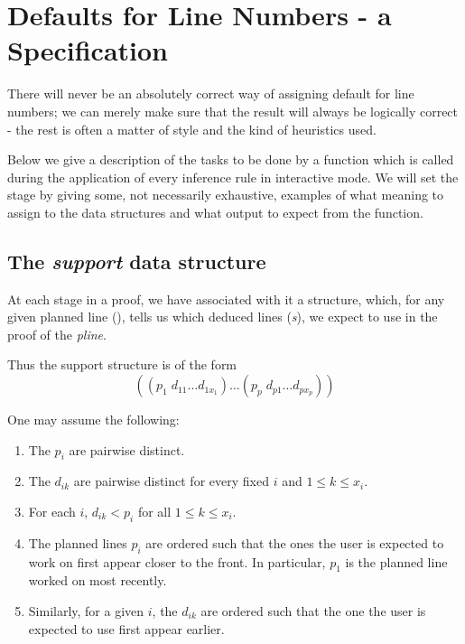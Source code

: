 
\section{Defaults for Line Numbers - a Specification}

There will never be an absolutely correct way
of assigning default for line numbers; we can merely make sure that
the result will always be logically correct - the rest is often
a matter of style and the kind of heuristics used.

Below we give a description of the tasks to be done by a function
 which is called during the application of every
inference rule {in interactive mode}.  We will set the stage by giving
some, not necessarily exhaustive, examples of what meaning to assign
to the data structures and what output to expect from the function.

\subsection{The {\it support} data structure}

At each stage in a proof, we have associated with it a {\it {}} structure,
which, for any given planned line ({\it {}}), tells us which deduced lines
({\it {}s}), we expect to use in the proof of the {\it pline}.

Thus the support structure is of the form
$$((p_1\; d_{11} \ldots d_{1x_1})\ldots (p_p\; d_{p1}\ldots d_{px_p}))$$

One may assume the following:
\begin{enumerate}
\item The $p_i$ are pairwise distinct.

\item The $d_{ik}$ are pairwise distinct for every fixed $i$ and $1\leq k \leq x_i$.

\item For each $i$, $d_{ik} < p_i$ for all $1\leq k \leq x_i$.

\item The planned lines $p_i$ are ordered such that the ones the user is
expected to work on first appear closer to the front.  In particular,
$p_1$ is the planned line worked on most recently.

\item Similarly, for a given $i$, the $d_{ik}$ are ordered such that the
one the user is expected to use first appear earlier.
\end{enumerate}

